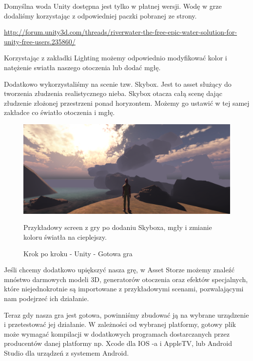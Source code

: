 \documentclass[12pt]{xmgr}
\begin{document}
Domyślna woda Unity dostępna jest tylko w płatnej wersji. Wodę w grze dodaliśmy korzystając z odpowiedniej paczki pobranej ze strony.

\href{http://forum.unity3d.com/threads/riverwater-the-free-epic-water-solution-for-unity-free-users.235860/}{http://forum.unity3d.com/threads/riverwater-the-free-epic-water-solution-for-unity-free-users.235860/}

Korzystając z zakładki Lighting możemy odpowiednio modyfikować kolor i natężenie swiatła naszego otoczenia lub dodać mgłę.

Dodatkowo wykorzystaliśmy na scenie tzw. Skybox. Jest to asset służący do tworzenia złudzenia realistycznego nieba. Skybox otacza całą scenę dając złudzenie złożonej przestrzeni ponad horyzontem. Możemy go ustawić w tej samej zakładce co światło otoczenia i mgłę.

\begin{figure}[!htb]
    \begin{center}
    \includegraphics[scale=0.25]{Screeny/UnityKrokPoKroku/gotowa_gra.png}
    \end{center}
    \caption{Krok po kroku - Unity - Gotowa gra}
Przykładowy screen z gry po dodaniu Skyboxa, mgły i zmianie koloru światła na cieplejszy.
\end{figure}

Jeśli chcemy dodatkowo upiększyć nasza grę, w Asset Storze możemy znaleźć mnóstwo darmowych modeli 3D, generatorów otoczenia oraz efektów specjalnych, które niejednokrotnie są importowane z przykładowymi scenami, pozwalającymi nam podejrzeć ich działanie.

Teraz gdy nasza gra jest gotowa, powinniśmy zbudować ją na wybrane urządzenie i przetestować jej działanie. W zależności od wybranej platformy, gotowy plik może wymagać kompilacji w dodatkowych programach dostarczanych przez producentów danej platformy np. Xcode dla IOS -a i AppleTV, lub Android Studio dla urządzeń z systemem Android.
\end{document}
